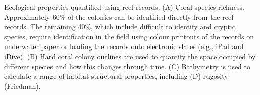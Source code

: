 Ecological properties quantified using reef records. (A) Coral species richness. Approximately 60\% of the colonies can be identified directly from the reef records. The remaining 40\%, which include difficult to identify and cryptic species, require identification in the field using colour printouts of the records on underwater paper or loading the records onto electronic slates (e.g., iPad and iDive). (B) Hard coral colony outlines are used to quantify the space occupied by different species and how this changes through time. (C) Bathymetry is used to calculate a range of habitat structural properties, including (D) rugosity (Friedman).  